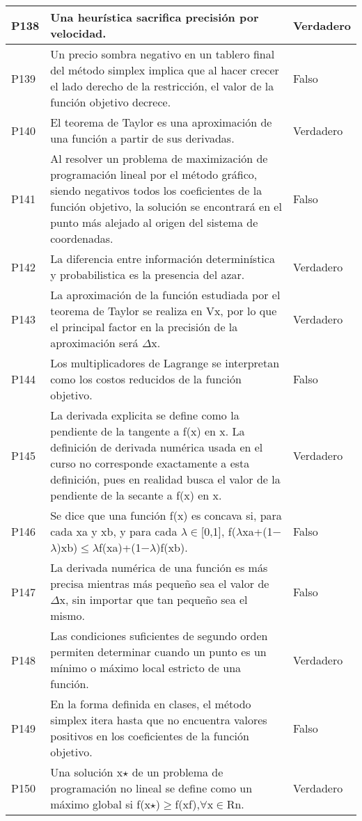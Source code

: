 \documentclass{article}
\begin{document}
\begin{longtable}{|p{1.5cm}|p{14cm}|p{2cm}|}
P138 & Una heurística sacrifica precisión por velocidad. & Verdadero \\ \hline
P139 & Un precio sombra negativo en un tablero final del método simplex implica que al hacer crecer el lado derecho de la restricción, el valor de la función objetivo decrece. & Falso \\ \hline
P140 & El teorema de Taylor es una aproximación de una función a partir de sus derivadas. & Verdadero \\ \hline
P141 & Al resolver un problema de maximización de programación lineal por el método gráfico, siendo negativos todos los coeficientes de la función objetivo, la solución se encontrará en el punto más alejado al origen del sistema de coordenadas. & Falso \\ \hline
P142 & La diferencia entre información determinística y probabilistica es la presencia del azar. & Verdadero \\ \hline
P143 & La aproximación de la función estudiada por el teorema de Taylor se realiza en Vx, por lo que el principal factor en la precisión de la aproximación será $\Delta$x. & Verdadero \\ \hline
P144 & Los multiplicadores de Lagrange se interpretan como los costos reducidos de la función objetivo. & Falso \\ \hline
P145 & La derivada explicita se define como la pendiente de la tangente a f(x) en x. La definición de derivada numérica usada en el curso no corresponde exactamente a esta definición, pues en realidad busca el valor de la pendiente de la secante a f(x) en x. & Verdadero \\ \hline
P146 & Se dice que una función f(x) es concava si, para cada xa y xb, y para cada $\lambda$$\in$[0,1], f($\lambda$xa+(1−$\lambda$)xb)$\leq$$\lambda$f(xa)+(1−$\lambda$)f(xb). & Falso \\ \hline
P147 & La derivada numérica de una función es más precisa mientras más pequeño sea el valor de $\Delta$x, sin importar que tan pequeño sea el mismo. & Falso \\ \hline
P148 & Las condiciones suficientes de segundo orden permiten determinar cuando un punto es un mínimo o máximo local estricto de una función. & Verdadero \\ \hline
P149 & En la forma definida en clases, el método simplex itera hasta que no encuentra valores positivos en los coeficientes de la función objetivo. & Falso \\ \hline
P150 & Una solución x$\star$ de un problema de programación no lineal se define como un máximo global si f(x$\star$)$\geq$f(xf),$\forall$x$\in$Rn. & Verdadero \\ \hline

\end{longtable}
\end{document}
